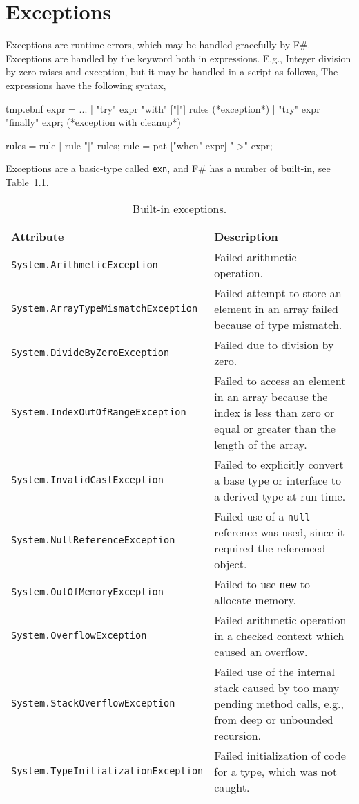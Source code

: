 \chapter{Exceptions}
\label{chap:exceptions}
Exceptions are runtime errors, which may be handled gracefully by F\#. Exceptions are handled by the  keyword both in expressions. E.g., Integer division by zero raises and exception, but it may be handled in a script as follows,
%
%
The  expressions have the following syntax,
%
\begin{verbatimwrite}{tmp.ebnf}
expr = ... 
  | "try" expr "with" ["|"] rules (*exception*)
  | "try" expr "finally" expr; (*exception with cleanup*)

rules = rule | rule "|" rules;
rule = pat ["when" expr] "->" expr;
\end{verbatimwrite}
%
Exceptions are a basic-type called \lstinline!exn!, and F\# has a number of built-in, see Table~\ref{tab:exceptions}.
\begin{table}
  \centering
  \begin{tabularx}{\linewidth}{|l|X|}
    \hline
    \rowcolor{headerRowColor} Attribute & Description\\
    \hline
    \lstinline!System.ArithmeticException! & Failed arithmetic operation.\\
   \hline
    \lstinline!System.ArrayTypeMismatchException! & Failed attempt to store an element in an array failed because of type mismatch.\\
   \hline
    \lstinline!System.DivideByZeroException! & Failed due to division by zero.\\
   \hline
    \lstinline!System.IndexOutOfRangeException! & Failed to access an element in an array because the index is less than zero or equal or greater than the length of the array.\\
   \hline
    \lstinline!System.InvalidCastException! & Failed to explicitly convert a base type or interface to a derived type at run time.\\
   \hline
    \lstinline!System.NullReferenceException! & Failed use of a \lstinline!null! reference was used, since it required the referenced object.\\
   \hline
    \lstinline!System.OutOfMemoryException! & Failed to use \lstinline!new! to allocate memory.\\ 
   \hline
    \lstinline!System.OverflowException! & Failed arithmetic operation in a checked context which caused an overflow.\\
   \hline
    \lstinline!System.StackOverflowException ! & Failed use of the internal stack caused by too many pending method calls, e.g., from deep or unbounded recursion.\\
   \hline
    \lstinline!System.TypeInitializationException! & Failed initialization of code for a type, which was not caught.\\
   \hline
  \end{tabularx}
  \caption{Built-in exceptions.}
  \label{tab:exceptions}
\end{table}
